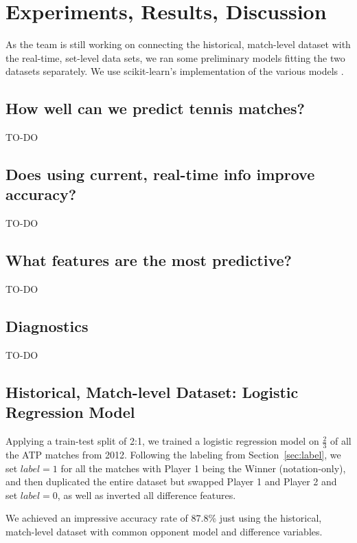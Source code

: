 \documentclass[paper=a4, fontsize=10pt]{scrartcl} %
\numberwithin{equation}{section} %
\numberwithin{figure}{section} %
\numberwithin{table}{section} %
\begin{document}

\section{Experiments, Results, Discussion}
As the team is still working on connecting the historical, match-level dataset with the real-time, set-level data sets, we ran some preliminary models fitting the two datasets separately. We use scikit-learn's implementation of the various models \cite{scikit-learn}.
\subsection{How well can we predict tennis matches?}
TO-DO
\subsection{Does using current, real-time info improve accuracy?}
TO-DO
\subsection{What features are the most predictive?}
TO-DO
\subsection{Diagnostics}
TO-DO

\subsection{Historical, Match-level Dataset: Logistic Regression Model}
Applying a train-test split of 2:1, we trained a logistic regression model on $\frac{2}{3}$ of all the ATP matches from 2012. Following the labeling from Section~\ref{sec:label}, we set $label = 1$ for all the matches with Player 1 being the Winner (notation-only), and then duplicated the entire dataset but swapped Player 1 and Player 2 and set $label = 0$, as well as inverted all difference features.

We achieved an impressive accuracy rate of 87.8\% just using the historical, match-level dataset with common opponent model and difference variables. 
\end{document}
